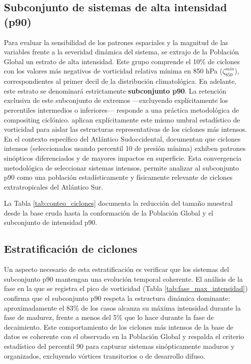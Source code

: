 \subsection{Subconjunto de sistemas de alta intensidad (p90)}\label{subsec:subconjuntos_intensidad}

Para evaluar la sensibilidad de los patrones espaciales y la magnitud de las variables frente a la severidad dinámica del sistema, se extrajo de la Población Global un estrato de alta intensidad.
Este grupo comprende el 10\% de ciclones con los valores más negativos de vorticidad relativa mínima en 850 hPa ($\zeta_{850}^{min}$), correspondientes al primer decil de la distribución climatológica. En adelante, este estrato se denominará estrictamente \textbf{subconjunto p90}. La retención exclusiva de este subconjunto de extremos —excluyendo explícitamente los percentiles intermedios o inferiores— responde a una práctica metodológica de compositing ciclónico. \citet{priestley2022improved} aplican explícitamente este mismo umbral estadístico de vorticidad para aislar las estructuras representativas de los ciclones más intensos.
En el contexto específico del Atlántico Sudoccidental, \citet{andrade2024composite} documentan que ciclones intensos (seleccionados usando percentil 10 de presión mínima) exhiben patrones sinópticos diferenciados y de mayores impactos en superficie. 
Esta convergencia metodológica de seleccionar sistemas intensos, permite analizar al subconjunto p90 como una población estadísticamente y físicamente relevante de ciclones extratropicales del Atlántico Sur.

La Tabla \ref{tab:conteo_ciclones} documenta la reducción del tamaño muestral desde la base cruda hasta la conformación de la Población Global y el subconjunto de intensidad p90.



\subsection{Estratificación de ciclones}\label{subsec:validacao_selecao}

Un aspecto necesario de esta estratificación es verificar que los sistemas del subconjunto p90 mantengan una evolución temporal coherente. 
El análisis de la fase en la que se registra el pico de vorticidad (Tabla \ref{tab:fase_max_intensidad}) confirma que el subconjunto p90 respeta la estructura dinámica dominante: aproximadamente el 83\% de los casos alcanza su máxima intensidad durante la fase de madurez, frente a menos del 5\% que lo hace durante la fase de decaimiento. 
Este comportamiento de los ciclones más intensos de la base de datos es coherente con el observado en la Población Global y respalda el criterio estadístico del percentil 90 para capturar sistemas sinópticamente maduros y organizados, excluyendo vórtices transitorios o de desarrollo difuso.

